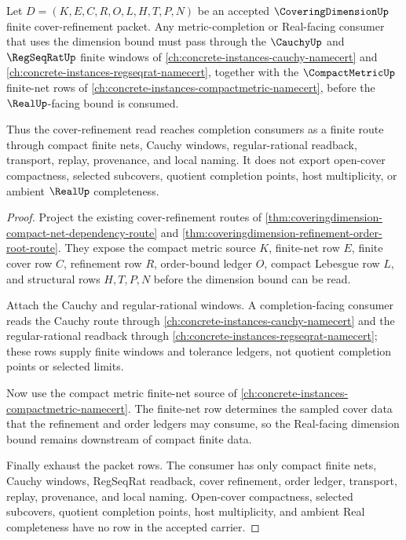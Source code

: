 \begin{theorem}
\label{thm:covering-dimension-cauchy-forward-link}
Let $D=(K,E,C,R,O,L,H,T,P,N)$ be an accepted $\CoveringDimensionUp$ finite cover-refinement packet. Any metric-completion or Real-facing consumer that uses the dimension bound must pass through the $\CauchyUp$ and $\RegSeqRatUp$ finite windows of \autoref{ch:concrete-instances-cauchy-namecert} and \autoref{ch:concrete-instances-regseqrat-namecert}, together with the $\CompactMetricUp$ finite-net rows of \autoref{ch:concrete-instances-compactmetric-namecert}, before the $\RealUp$-facing bound is consumed.

Thus the cover-refinement read reaches completion consumers as a finite route through compact finite nets, Cauchy windows, regular-rational readback, transport, replay, provenance, and local naming. It does not export open-cover compactness, selected subcovers, quotient completion points, host multiplicity, or ambient $\RealUp$ completeness.
\end{theorem}
\begin{proof}
Project the existing cover-refinement routes of \autoref{thm:coveringdimension-compact-net-dependency-route} and \autoref{thm:coveringdimension-refinement-order-root-route}. They expose the compact metric source $K$, finite-net row $E$, finite cover row $C$, refinement row $R$, order-bound ledger $O$, compact Lebesgue row $L$, and structural rows $H,T,P,N$ before the dimension bound can be read.

Attach the Cauchy and regular-rational windows. A completion-facing consumer reads the Cauchy route through \autoref{ch:concrete-instances-cauchy-namecert} and the regular-rational readback through \autoref{ch:concrete-instances-regseqrat-namecert}; these rows supply finite windows and tolerance ledgers, not quotient completion points or selected limits.

Now use the compact metric finite-net source of \autoref{ch:concrete-instances-compactmetric-namecert}. The finite-net row determines the sampled cover data that the refinement and order ledgers may consume, so the Real-facing dimension bound remains downstream of compact finite data.

Finally exhaust the packet rows. The consumer has only compact finite nets, Cauchy windows, RegSeqRat readback, cover refinement, order ledger, transport, replay, provenance, and local naming. Open-cover compactness, selected subcovers, quotient completion points, host multiplicity, and ambient Real completeness have no row in the accepted carrier.
\end{proof}
